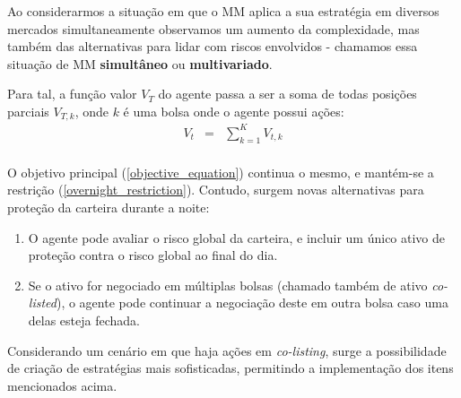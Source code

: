 Ao considerarmos a situação em que o MM aplica a sua estratégia em diversos mercados simultaneamente observamos um aumento da complexidade, mas também das alternativas para lidar com riscos envolvidos - chamamos essa situação de MM \textbf{simultâneo} ou \textbf{multivariado}.

Para tal, a função valor $V_{T}$ do agente passa a ser a soma de todas posições parciais $V_{T, k}$, onde $k$ é uma bolsa onde o agente possui ações:
\begin{eqnarray*}
    V_t &=& \sum_{k=1}^K V_{t, k}\\
\end{eqnarray*}

O objetivo principal (\ref{objective_equation}) continua o mesmo, e mantém-se a restrição (\ref{overnight_restriction}). Contudo, surgem novas alternativas para proteção da carteira durante a noite:

\begin{enumerate}
    \item O agente pode avaliar o risco global da carteira, e incluir um único ativo de proteção contra o risco global ao final do dia.
    \item Se o ativo for negociado em múltiplas bolsas (chamado também de ativo \textit{co-listed}), o agente pode continuar a negociação deste em outra bolsa caso uma delas esteja fechada.
\end{enumerate}

Considerando um cenário em que haja ações em \textit{co-listing}, surge a possibilidade de criação de estratégias mais sofisticadas, permitindo a implementação dos itens mencionados acima.
